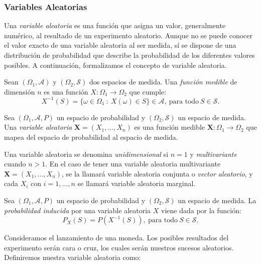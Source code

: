\subsubsection{Variables Aleatorias}
Una \textit{variable aleatoria} es una función que asigna un valor, generalmente numérico, al resultado de un experimento aleatorio. Aunque no se puede conocer el valor exacto de una variable aleatoria al ser medida, sí se dispone de una distribución de probabilidad que describe la probabilidad de los diferentes valores posibles. A continuación, formalizamos el concepto de variable aleatoria.

\begin{definition}
Sean $(\Omega_1, \mathcal{A})$ y $(\Omega_2, \mathcal{S})$ dos espacios de medida. Una \textit{función medible} de dimensión $n$ es una función $X \colon \Omega_1 \to \Omega_2$ que cumple: $$X^{-1}(S) = \{\omega \in \Omega_1 \ : \ X(\omega) \in S\} \in \mathcal{A}, \ \text{para todo} \ S \in \mathcal{S}.$$
\end{definition}

\begin{definition}
Sea $(\Omega_1, \mathcal{A}, P)$ un espacio de probabilidad y $(\Omega_2, \mathcal{S})$ un espacio de medida. Una \textit{variable aleatoria} $\mathbf{X} = (X_1, \dots, X_n)$ es una función medible $\mathbf{X} \colon \Omega_1 \to \Omega_2$ que mapea del espacio de probabilidad al espacio de medida.
\end{definition}

Una variable aleatoria se denomina \textit{unidimensional} si $n=1$ y \textit{multivariante} cuando $n > 1$. En el caso de tener una variable aleatoria multivariante $\mathbf{X} = (X_1, \ldots, X_n)$, se la llamará variable aleatoria conjunta o \textit{vector aleatorio}, y cada $X_i$ con $i=1, \ldots, n$ se llamará variable aleatoria marginal.

\begin{definition}
Sea $(\Omega_1, \mathcal{A},P)$ un espacio de probabilidad y $(\Omega_2, \mathcal{S})$ un espacio de medida. La \textit{probabilidad inducida} por una variable aleatoria $X$ viene dada por la función: $$P_X(S)=P(X^{-1}(S)), \ \text{para todo} \ S \in \mathcal{S}.$$
\end{definition}

Consideramos el lanzamiento de una moneda. Los posibles resultados del experimento serán cara o cruz, los cuales serán nuestros sucesos aleatorios. Definiremos nuestra variable aleatoria como: 

